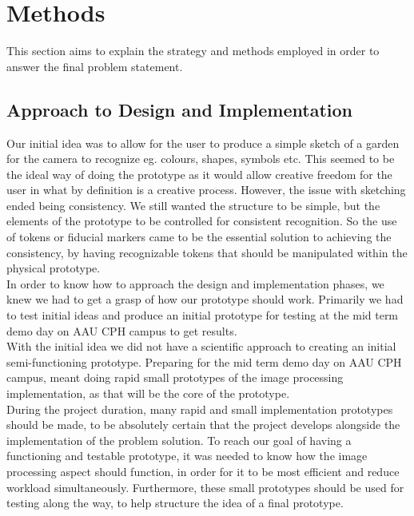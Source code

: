\chapter{Methods}
This section aims to explain the strategy and methods employed in order to answer the final problem statement. 

\section{Approach to Design and Implementation}

Our initial idea was to allow for the user to produce a simple sketch of a garden for the camera to recognize eg. colours, shapes, symbols etc. This seemed to be the ideal way of doing the prototype as it would allow creative freedom for the user in what by definition is a creative process. However, the issue with sketching ended being consistency. We still wanted the structure to be simple, but the elements of the prototype to be controlled for consistent recognition. So the use of tokens or fiducial markers came to be the essential solution to achieving the consistency, by having recognizable tokens that should be manipulated within the physical prototype.\\


In order to know how to approach the design and implementation phases, we knew we had to get a grasp of how our prototype should work. Primarily we had to test initial ideas and produce an initial prototype for testing at the mid term demo day on AAU CPH campus to get results.\\


With the initial idea we did not have a scientific approach to creating an initial semi-functioning prototype. Preparing for the mid term demo day on AAU CPH campus, meant doing rapid small prototypes of the image processing implementation, as that will be the core of the prototype.\\


During the project duration, many rapid and small implementation prototypes should be made, to be absolutely certain that the project develops alongside the implementation of the problem solution.
To reach our goal of having a functioning and testable prototype, it was needed to know how the image processing aspect should function, in order for it to be most efficient and reduce workload simultaneously. Furthermore, these small prototypes should be used for testing along the way, to help structure the idea of a final prototype. \\

